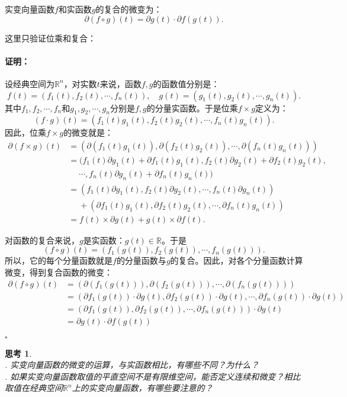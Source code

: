 \documentclass[12pt,UTF8]{ctexbook}
\theoremstyle{definition}
\theoremstyle{plain}
\newtheorem{sk}{思考}[section]
\renewenvironment{proof}{\paragraph{\textbf{证明：}}}{\hfill$\square$}
\begin{document}
实变向量函数$f$和实函数$g$的复合的微变为：
$$ \partial (f \circ g) (t) = \partial g(t) \cdot \partial f(g(t)). $$

这里只验证位乘和复合：
\begin{proof}
    设经典空间为$\mathbb{R}^n$，对实数$t$来说，函数$f,g$的函数值分别是：
    $$ f(t) = (f_1(t), f_2(t), \cdots, f_n(t)), \quad g(t) = (g_1(t), g_2(t), \cdots, g_n(t)). $$
    其中$f_1, f_2, \cdots, f_n$和$g_1, g_2, \cdots, g_n$分别是$f,g$的分量实函数。于是位乘$f \times g$定义为：
    $$ (f \cdot g)(t) = (f_1(t)g_1(t), f_2(t)g_2(t), \cdots, f_n(t)g_n(t)). $$
    因此，位乘$f\times g$的微变就是：
    \begin{align*}
        \partial (f \times g)(t) &= (\partial (f_1(t)g_1(t)), \partial (f_2(t)g_2(t)), \cdots, \partial (f_n(t)g_n(t))) \\
        &= (f_1(t)\partial g_1(t) + \partial f_1(t) g_1(t), f_2(t)\partial g_2(t) + \partial f_2(t) g_2(t), \\
        &\;\quad \cdots, f_n(t)\partial g_n(t) + \partial f_n(t) g_n(t)) \\
        &= (f_1(t)\partial g_1(t), f_2(t)\partial g_2(t), \cdots, f_n(t)\partial g_n(t)) \\
        &\;\quad + (\partial f_1(t) g_1(t), \partial f_2(t) g_2(t), \cdots, \partial f_n(t) g_n(t)) \\
        &= f(t) \times \partial g(t) + g(t) \times \partial f(t).
    \end{align*}

    对函数的复合来说，$g$是实函数：$g(t)\in\mathbb{R}$。于是
    $$ (f \circ g) (t) = (f_1(g(t)), f_2(g(t)), \cdots, f_n(g(t))). $$
    所以，它的每个分量函数就是$f$的分量函数与$g$的复合。因此，对各个分量函数计算微变，得到复合函数的微变：
    \begin{align*}
        \partial (f \circ g) (t) &= (\partial (f_1(g(t))), \partial (f_2(g(t))), \cdots, \partial (f_n(g(t)))) \\
        &= (\partial f_1(g(t)) \cdot \partial g(t), \partial f_2(g(t)) \cdot \partial g(t), \cdots, \partial f_n(g(t)) \cdot \partial g(t)) \\
        &= (\partial f_1(g(t)), \partial f_2(g(t)), \cdots, \partial f_n(g(t)) ) \cdot \partial g(t) \\
        &=  \partial g(t) \cdot \partial f(g(t))
    \end{align*}
    
\end{proof}

\begin{sk}
    \mbox{} \\
    . 实变向量函数的微变的运算，与实函数相比，有哪些不同？为什么？\\
    . 如果实变向量函数取值的平直空间不是有限维空间，能否定义连续和微变？相比取值在经典空间$\mathbb{R}^n$上的实变向量函数，有哪些要注意的？
\end{sk}
\end{document}
